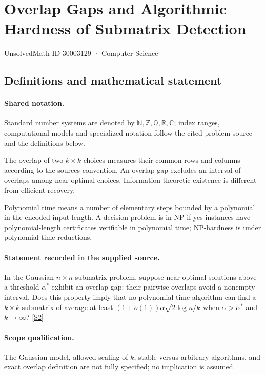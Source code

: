 \documentclass[11pt]{article}
\newcommand{\sref}[2]{\hyperlink{source:#1:#2}{[S#2]}}
\begin{document}
\setcounter{section}{30003128}
\section{Overlap Gaps and Algorithmic Hardness of Submatrix Detection}\label{30003129}
{\small\sffamily UnsolvedMath ID 30003129 · Computer Science}
\subsection{Definitions and mathematical statement}

\paragraph{Shared notation.}Standard number systems are denoted by $\mathbb N,\mathbb Z,\mathbb Q,\mathbb R,\mathbb C$; index ranges, computational models and specialized notation follow the cited problem source and the definitions below.


The overlap of two $k\times k$ choices measures their common rows and columns according to the source\textquotesingle s convention. An overlap gap excludes an interval of overlaps among near-optimal choices. Information-theoretic existence is different from efficient recovery.

Polynomial time means a number of elementary steps bounded by a polynomial in the encoded input length. A decision problem is in $\mathrm{NP}$ if yes-instances have polynomial-length certificates verifiable in polynomial time; NP-hardness is under polynomial-time reductions.
\paragraph{Statement recorded in the supplied source.}
In the Gaussian $n\times n$ submatrix problem, suppose near-optimal solutions above a threshold $\alpha^*$ exhibit an overlap gap: their pairwise overlaps avoid a nonempty interval. Does this property imply that no polynomial-time algorithm can find a $k\times k$ submatrix of average at least $(1+o(1))\alpha\sqrt{2\log n/k}$ when $\alpha>\alpha^*$ and $k\to\infty$? \sref{30003129}{2}
\paragraph{Scope qualification.}
The Gaussian model, allowed scaling of $k$, stable-versus-arbitrary algorithms, and exact overlap definition are not fully specified; no implication is assumed.
\end{document}
